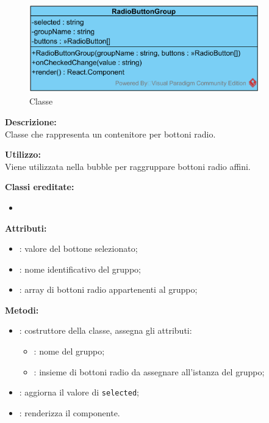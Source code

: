 \paragraph[::RadioButtonGroup]{\class}\mbox{}\\ \label{\class}
\begin{figure}[H]
	\centering
	\includegraphics[width=10cm]{./diagrammi/framework/view/gui/radiobuttongroup.png}
	\caption{Classe \class}
\end{figure}
\textbf{Descrizione:}\\
Classe che rappresenta un contenitore per bottoni radio.

\textbf{Utilizzo:}\\
Viene utilizzata nella bubble per raggruppare bottoni radio affini.

\textbf{Classi ereditate:}
\begin{itemize}
	\item {}
\end{itemize}


\textbf{Attributi:}
\begin{itemize}
	\item {}: valore del bottone selezionato;
	\item {}: nome identificativo del gruppo;
	\item {}: array di bottoni radio appartenenti al gruppo;
\end{itemize}

\textbf{Metodi:}
\begin{itemize}
	\item {}: costruttore della classe, assegna gli attributi:
	\begin{itemize}
		\item {}: nome del gruppo;
		\item {}: insieme di bottoni radio da assegnare all'istanza del gruppo;
	\end{itemize}
	\item {}: aggiorna il valore di \texttt{selected};
	\item {}: renderizza il componente.
\end{itemize}


